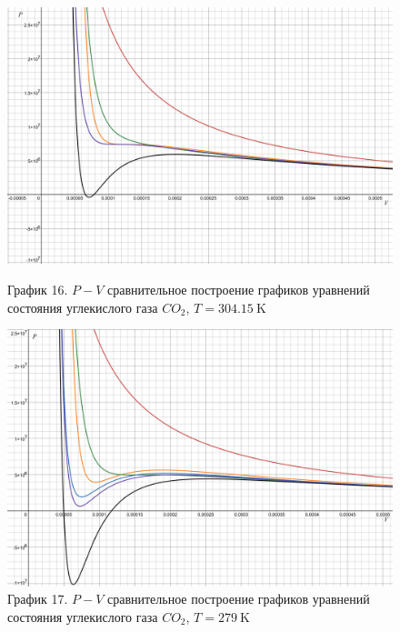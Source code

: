 \documentclass[a4paper]{article}
\numberwithin{equation}{subsection} %
\begin{document}
\begin{figure}[h!]
    \centering
    \begin{minipage}{0.49\textwidth}
        \centering
        \includegraphics[width=\linewidth]{Graphics/CO2/304_15.png}
        \caption{\label{fig:clausius_1}График 16. $P-V$ сравнительное построение графиков уравнений состояния углекислого газа $CO_2$, $T = 304.15 \ \text{K}$}
    \end{minipage}
    \hfill
    \begin{minipage}{0.49\textwidth}
        \centering
        \includegraphics[width=\linewidth]{Graphics/CO2/279.png}
        \caption{\label{fig:clausius_1}График 17. $P-V$ сравнительное построение графиков уравнений состояния углекислого газа $CO_2$, $T = 279 \ \text{K}$}
    \end{minipage}
\end{figure}
\clearpage
\end{document}
